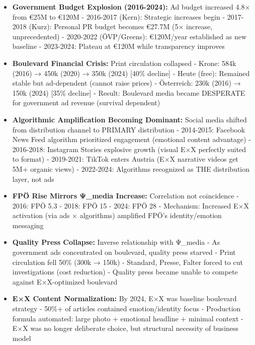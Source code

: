 \begin{itemize}
\item \textbf{Government Budget Explosion (2016-2024):} Ad budget increased 4.8× from €25M to €120M
  - 2016-2017 (Kern): Strategic increases begin
  - 2017-2018 (Kurz): Personal PR budget becomes €27.7M (5× increase, unprecedented)
  - 2020-2022 (ÖVP/Greens): €120M/year established as new baseline
  - 2023-2024: Plateau at €120M while transparency improves

\item \textbf{Boulevard Financial Crisis:} Print circulation collapsed
  - Krone: 584k (2016) → 450k (2020) → 350k (2024) [40\% decline]
  - Heute (free): Remained stable but ad-dependent (cannot raise prices)
  - Österreich: 230k (2016) → 150k (2024) [35\% decline]
  - Result: Boulevard media became DESPERATE for government ad revenue (survival dependent)

\item \textbf{Algorithmic Amplification Becoming Dominant:} Social media shifted from distribution channel
  to PRIMARY distribution
  - 2014-2015: Facebook News Feed algorithm prioritized engagement (emotional content advantage)
  - 2016-2018: Instagram Stories explosive growth (visual E×X perfectly suited to format)
  - 2019-2021: TikTok enters Austria (E×X narrative videos get 5M+ organic views)
  - 2022-2024: Algorithms recognized as THE distribution layer, not ads

\item \textbf{FPÖ Rise Mirrors Ψ_media Increase:} Correlation not coincidence
  - 2016: FPÖ 5.3%
  - 2018: FPÖ 15%
  - 2024: FPÖ 28%
  - Mechanism: Increased E×X activation (via ads × algorithms) amplified FPÖ's identity/emotion messaging

\item \textbf{Quality Press Collapse:} Inverse relationship with Ψ_media
  - As government ads concentrated on boulevard, quality press starved
  - Print circulation fell 50\% (300k → 150k)
  - Standard, Presse, Falter forced to cut investigations (cost reduction)
  - Quality press became unable to compete against E×X-optimized boulevard

\item \textbf{E×X Content Normalization:} By 2024, E×X was baseline boulevard strategy
  - 50\%+ of articles contained emotion/identity focus
  - Production formula automated: large photo + emotional headline + minimal context
  - E×X was no longer deliberate choice, but structural necessity of business model

\end{itemize}

